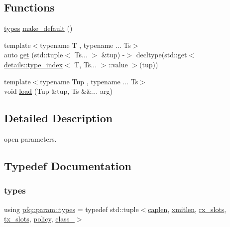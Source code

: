\subsection*{Functions}
\begin{DoxyCompactItemize}
\item 
\hyperlink{namespacepfq_1_1param_adbf782e10a59b40189d34c425ff8218e}{types} \hyperlink{namespacepfq_1_1param_af1fd1aeb980688527db587b35f55abf2}{make\+\_\+default} ()
\item 
{\footnotesize template$<$typename T , typename ... Ts$>$ }\\auto \hyperlink{namespacepfq_1_1param_a26825d94a20bcf1cc8353307ea00f5b7}{get} (std\+::tuple$<$ Ts... $>$ \&tup) -\/$>$ decltype(std\+::get$<$ \hyperlink{structpfq_1_1param_1_1details_1_1type__index}{details\+::type\+\_\+index}$<$ T, Ts... $>$\+::value $>$(tup))
\item 
{\footnotesize template$<$typename Tup , typename ... Ts$>$ }\\void \hyperlink{namespacepfq_1_1param_a471f17aaae9cec51e821654d80d825cd}{load} (Tup \&tup, Ts \&\&... arg)
\end{DoxyCompactItemize}


\subsection{Detailed Description}
open parameters. 

\subsection{Typedef Documentation}
\mbox{\label{namespacepfq_1_1param_adbf782e10a59b40189d34c425ff8218e}} 
\subsubsection{\texorpdfstring{types}{types}}
{\footnotesize\ttfamily using \hyperlink{namespacepfq_1_1param_adbf782e10a59b40189d34c425ff8218e}{pfq\+::param\+::types} = typedef std\+::tuple$<$\hyperlink{structpfq_1_1param_1_1caplen}{caplen}, \hyperlink{structpfq_1_1param_1_1xmitlen}{xmitlen}, \hyperlink{structpfq_1_1param_1_1rx__slots}{rx\+\_\+slots}, \hyperlink{structpfq_1_1param_1_1tx__slots}{tx\+\_\+slots}, \hyperlink{structpfq_1_1param_1_1policy}{policy}, \hyperlink{structpfq_1_1param_1_1class__}{class\+\_\+}$>$}



